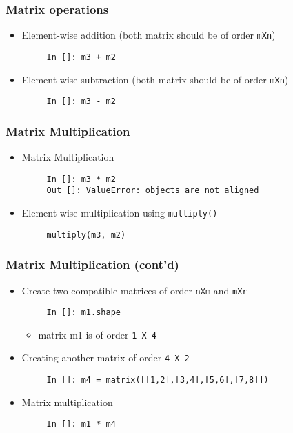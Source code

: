 \documentclass[presentation]{beamer}
\begin{document}
\begin{frame}[fragile]
\frametitle{Matrix operations}
\label{sec-3}

\begin{itemize}
\item Element-wise addition (both matrix should be of order \texttt{mXn})
\begin{verbatim}
     In []: m3 + m2
\end{verbatim}

\item Element-wise subtraction (both matrix should be of order \texttt{mXn})
\begin{verbatim}
     In []: m3 - m2
\end{verbatim}

\end{itemize}
\end{frame}
\begin{frame}[fragile]
\frametitle{Matrix Multiplication}
\label{sec-4}

\begin{itemize}
\item Matrix Multiplication
\begin{verbatim}
     In []: m3 * m2
     Out []: ValueError: objects are not aligned
\end{verbatim}

\item Element-wise multiplication using \texttt{multiply()}
\begin{verbatim}
     multiply(m3, m2)
\end{verbatim}

\end{itemize}
\end{frame}
\begin{frame}[fragile]
\frametitle{Matrix Multiplication (cont'd)}
\label{sec-5}

\begin{itemize}
\item Create two compatible matrices of order \texttt{nXm} and \texttt{mXr}
\begin{verbatim}
     In []: m1.shape
\end{verbatim}


\begin{itemize}
\item matrix m1 is of order \texttt{1 X 4}
\end{itemize}

\item Creating another matrix of order \texttt{4 X 2}
\begin{verbatim}
     In []: m4 = matrix([[1,2],[3,4],[5,6],[7,8]])
\end{verbatim}

\item Matrix multiplication
\begin{verbatim}
     In []: m1 * m4
\end{verbatim}

\end{itemize}
\end{frame}
\end{document}
